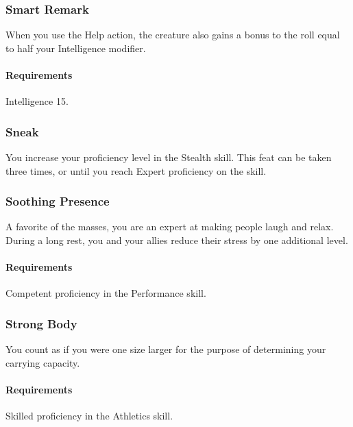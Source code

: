 \subsubsection{Smart Remark} \label{feat::smartremark}
    When you use the Help action, the creature also gains a bonus to the roll equal to half your Intelligence modifier.
    \paragraph{Requirements} Intelligence 15.
\subsubsection{Sneak} \label{feat::sneak}
    You increase your proficiency level in the Stealth skill.
    This feat can be taken three times, or until you reach Expert proficiency on the skill.
\subsubsection{Soothing Presence} \label{feat::soothingpresence}
    A favorite of the masses, you are an expert at making people laugh and relax.
    During a long rest, you and your allies reduce their stress by one additional level.
    \paragraph{Requirements} Competent proficiency in the Performance skill.
\subsubsection{Strong Body} \label{feat::strongbody}
    You count as if you were one size larger for the purpose of determining your carrying capacity.
    \paragraph{Requirements} Skilled proficiency in the Athletics skill.
